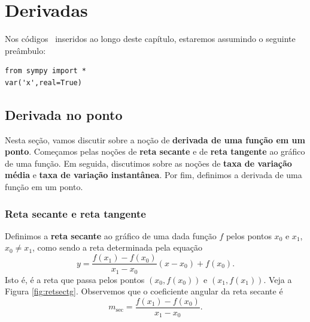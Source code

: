 
\chapter{Derivadas}\label{cap_deriv}
\thispagestyle{fancy}

\ifispython
\begin{obs}\label{obs:cap_deriv_python}
  Nos códigos \python~inseridos ao longo deste capítulo, estaremos assumindo o seguinte preâmbulo:
\begin{verbatim}
from sympy import *
var('x',real=True)
\end{verbatim}
\end{obs}
\fi

\section{Derivada no ponto}\label{cap_deriv_sec_derivpt}

Nesta seção, vamos discutir sobre a noção de {\bf derivada de uma função em um ponto}. Começamos pelas noções de {\bf reta secante} e de {\bf reta tangente} ao gráfico de uma função. Em seguida, discutimos sobre as noções de {\bf taxa de variação média} e {\bf taxa de variação instantânea}. Por fim, definimos a derivada de uma função em um ponto.

\subsection{Reta secante e reta tangente}

Definimos a {\bf reta secante} ao gráfico de uma dada função $f$ pelos pontos $x_0$ e $x_1$, $x_0\neq x_1$, como sendo a reta determinada pela equação
\begin{equation}
  y = \frac{f(x_1)-f(x_0)}{x_1-x_0}(x-x_0)+f(x_0).
\end{equation}
Isto é, é a reta que passa pelos pontos $(x_0,f(x_0))$ e $(x_1,f(x_1))$. Veja a Figura \ref{fig:retsectg}. Observemos que o coeficiente angular da reta secante é
\begin{equation}
  m_{\text{sec}} = \frac{f(x_1)-f(x_0)}{x_1-x_0}.
\end{equation}

